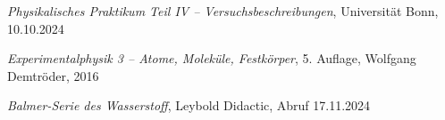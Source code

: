 \documentclass{article}
\begin{document}
\clearpage
\begin{thebibliography}{9}

\textit{Physikalisches Praktikum Teil IV -- Versuchsbeschreibungen}, Universität Bonn, 10.10.2024

\textit{Experimentalphysik 3 -- Atome, Moleküle, Festkörper}, 5. Auflage, Wolfgang Demtröder, 2016

\textit{Balmer-Serie des Wasserstoff}, Leybold Didactic, Abruf 17.11.2024

\end{thebibliography}
\end{document}
